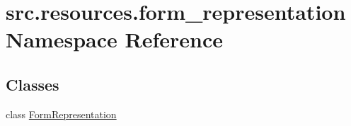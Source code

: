 \hypertarget{namespacesrc_1_1resources_1_1form__representation}{\section{src.\+resources.\+form\+\_\+representation Namespace Reference}
\label{namespacesrc_1_1resources_1_1form__representation}
}
\subsection*{Classes}
\begin{DoxyCompactItemize}
\item 
class \hyperlink{classsrc_1_1resources_1_1form__representation_1_1_form_representation}{Form\+Representation}
\end{DoxyCompactItemize}
